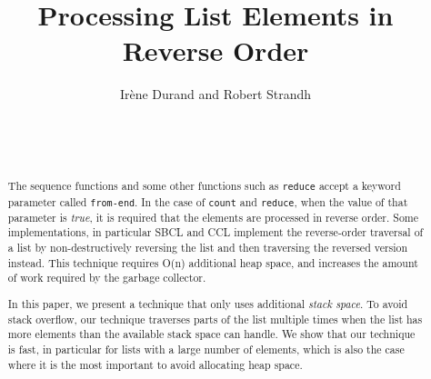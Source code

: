 \documentclass{acm_proc_article-sp}
\begin{document}
\title{Processing List Elements in Reverse Order}
\author{\alignauthor
Irène Durand and Robert Strandh\\
\\
\\
\\
}


\maketitle

\begin{abstract}
The \commonlisp{} sequence functions and some other functions such as
\texttt{reduce} accept a keyword parameter called \texttt{from-end}.
In the case of \texttt{count} and \texttt{reduce}, when the value of
that parameter is \emph{true}, it is required that the elements are
processed in reverse order.  Some implementations, in particular SBCL
and CCL implement the reverse-order traversal of a list by
non-destructively reversing the list and then traversing the reversed
version instead.  This technique requires O(n) additional heap space,
and increases the amount of work required by the garbage collector.

In this paper, we present a technique that only uses additional
\emph{stack space}.  To avoid stack overflow, our technique traverses
parts of the list multiple times when the list has more elements than
the available stack space can handle.  We show that our technique is
fast, in particular for lists with a large number of elements, which
is also the case where it is the most important to avoid allocating
heap space.
\end{abstract}
\end{document}
